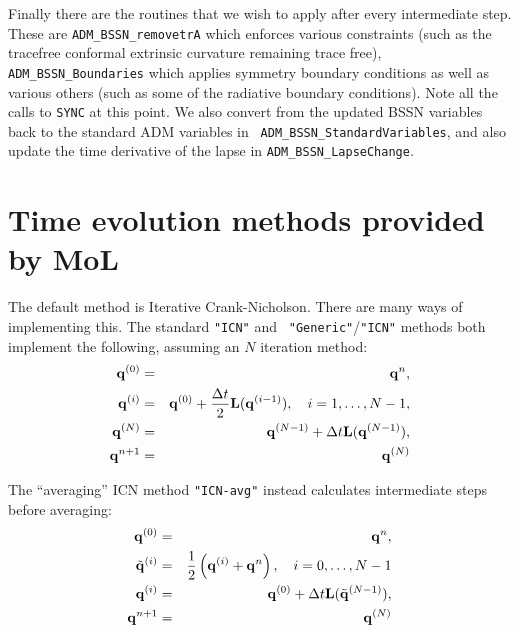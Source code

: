 Finally there are the routines that we wish to apply after every
intermediate step. These are {\tt ADM\_BSSN\_removetrA} which enforces
various constraints (such as the tracefree conformal extrinsic
curvature remaining trace free), {\tt ADM\_BSSN\_Boundaries} which
applies symmetry boundary conditions as well as various others (such
as some of the radiative boundary conditions). Note all the calls to
{\tt SYNC} at this point. We also convert from the updated BSSN
variables back to the standard ADM variables in {\tt
  ADM\_BSSN\_StandardVariables}, and also update the time derivative
of the lapse in {\tt ADM\_BSSN\_LapseChange}.

\section{Time evolution methods provided by MoL}
\label{CactusBase_MoL_sec:methods}

The default method is Iterative Crank-Nicholson. There are many ways
of implementing this. The standard {\tt "ICN"} and {\tt
  "Generic"}/{\tt"ICN"} methods both implement the following, assuming
an $N$ iteration method:
\begin{eqnarray}
  \label{CactusBase_MoL_eq:icn}
  {\bf q}^{(0)} & = & {\bf q}^{n}, \\
  {\bf q}^{(i)} & = & {\bf q}^{(0)} + \frac{\Delta t}{2} {\bf L}({\bf
    q}^{(i-1)}), \quad i = 1,\dots,N-1, \\
  {\bf q}^{(N)} & = & {\bf q}^{(N-1)} + \Delta t {\bf L}({\bf
    q}^{(N-1)}), \\
  {\bf q}^{n+1} & = & {\bf q}^{(N)}
\end{eqnarray}

The ``averaging'' ICN method {\tt "ICN-avg"} instead calculates
intermediate steps before averaging:
\begin{eqnarray}
  \label{CactusBase_MoL_eq:icn-avg}
  {\bf q}^{(0)} & = & {\bf q}^{n}, \\
  \tilde{{\bf q}}^{(i)} & = & \frac{1}{2}\left( {\bf q}^{(i)} + {\bf
      q}^{n} \right), \quad i = 0,\dots,N-1 \\
  {\bf q}^{(i)} & = & {\bf q}^{(0)} +  \Delta t {\bf L}(\tilde{{\bf
      q}}^{(N-1)}), \\
  {\bf q}^{n+1} & = & {\bf q}^{(N)}
\end{eqnarray}

